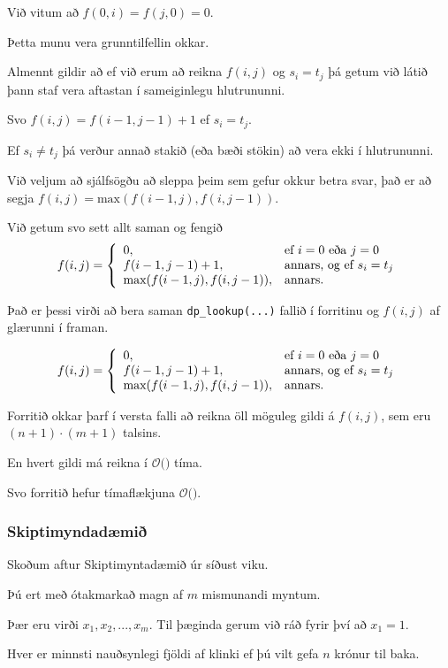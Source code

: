 {
	{
		\item<1-> Við vitum að $f(0, i) = f(j, 0) = 0$.
		\item<2-> Þetta munu vera grunntilfellin okkar.
		\item<3-> Almennt gildir að ef við erum að reikna $f(i, j)$ og $s_i = t_j$ þá getum við látið þann staf vera aftastan í sameiginlegu hlutrununni.
		\item<4-> Svo $f(i, j) = f(i - 1, j - 1) + 1$ ef $s_i = t_j$.
		\item<5-> Ef $s_i \neq t_j$ þá verður annað stakið (eða bæði stökin) að vera ekki í hlutrununni.
		\item<6-> Við veljum að sjálfsögðu að sleppa þeim sem gefur okkur betra svar, það er að segja $f(i, j) = \text{max}(f(i - 1, j), f(i, j - 1))$.
		\item<7-> Við getum svo sett allt saman og fengið
		\[
			f(i, j) =
			\left \{
			\env{array}
			{
				{l l}
				0, & \text{ef $i = 0$ eða $j = 0$}\\
				f(i - 1, j - 1) + 1, & \text{annars, og ef $s_i = t_j$}\\
				\text{max}(f(i - 1, j), f(i, j - 1)), & \text{annars}.
			}
			\right .
		\]
	}
}

{
}

{
	{
		\item<1-> Það er þessi virði að bera saman \texttt{dp\_lookup(...)} fallið í forritinu og $f(i, j)$ af glærunni í framan.
	}
	\[
		f(i, j) =
		\left \{
		\env{array}
		{
			{l l}
			0, & \text{ef $i = 0$ eða $j = 0$}\\
			f(i - 1, j - 1) + 1, & \text{annars, og ef $s_i = t_j$}\\
			\text{max}(f(i - 1, j), f(i, j - 1)), & \text{annars}.
		}
		\right .
	\]
}

{
	{
		\item<1-> Forritið okkar þarf í versta falli að reikna öll möguleg gildi á $f(i, j)$, sem eru $(n + 1) \cdot (m + 1)$ talsins.
		\item<2-> En hvert gildi má reikna í $\mathcal{O}($$)$ tíma.
		\item<4-> Svo forritið hefur tímaflækjuna $\mathcal{O}($\onslide<5->{$n \cdot m$}$)$.
	}
}

{
	\frametitle{Skiptimyndadæmið}
	{
		\item<1-> Skoðum aftur Skiptimyntadæmið úr síðust viku.
		\item<2-> Þú ert með ótakmarkað magn af $m$ mismunandi myntum.
		\item<3-> Þær eru virði  $x_1, x_2, ..., x_m$. Til þæginda gerum við ráð fyrir því að $x_1 = 1$.
		\item<4-> Hver er minnsti nauðsynlegi fjöldi af klinki ef þú vilt gefa $n$ krónur til baka.
	}
}

